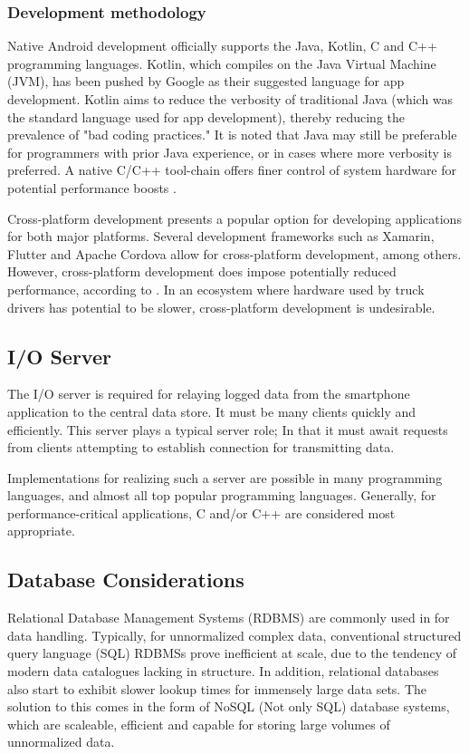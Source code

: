 \subsubsection{Development methodology}
Native Android development officially supports the Java, Kotlin, C and C++ programming languages.
Kotlin, which compiles on the Java Virtual Machine (JVM), has been pushed by Google as their suggested language for app development.
Kotlin aims to reduce the verbosity of traditional Java (which was the standard language used for app development), thereby reducing the prevalence of "bad coding practices." \cite{flauzino2018you}
It is noted that Java may still be preferable for programmers with prior Java experience, or in cases where more verbosity is preferred.
A native C/C++ tool-chain offers finer control of system hardware for potential performance boosts \cite{kwan2012google}.

Cross-platform development presents a popular option for developing applications for both major platforms.
Several development frameworks such as Xamarin, Flutter and Apache Cordova allow for cross-platform development, among others.
However, cross-platform development does impose potentially reduced performance, according to \cite{biorn2020empirical}.
In an ecosystem where hardware used by truck drivers has potential to be slower, cross-platform development is undesirable.

\subsection{I/O Server}
The I/O server is required for relaying logged data from the smartphone application to the central data store. It must be many clients quickly and efficiently.
This server plays a typical server role; In that it must await requests from clients attempting to establish connection for transmitting data.

Implementations for realizing such a server are possible in many programming languages, and almost all top popular programming languages. 
Generally, for performance-critical applications, C and/or C++ are considered most appropriate. \cite{ogala2020comparative}

\subsection{Database Considerations}
Relational Database Management Systems (RDBMS) are commonly used in for data handling.
Typically, for unnormalized complex data, conventional structured query language (SQL) RDBMSs prove inefficient at scale, due to the tendency of modern data catalogues lacking in structure.
In addition, relational databases also start to exhibit slower lookup times for immensely large data sets.
The solution to this comes in the form of NoSQL (Not only SQL) database systems, which are scaleable, efficient and capable for storing large volumes of unnormalized data. \cite{gupta2017nosql} \cite{qader2018comparative} \cite{ongo2018hybrid}

